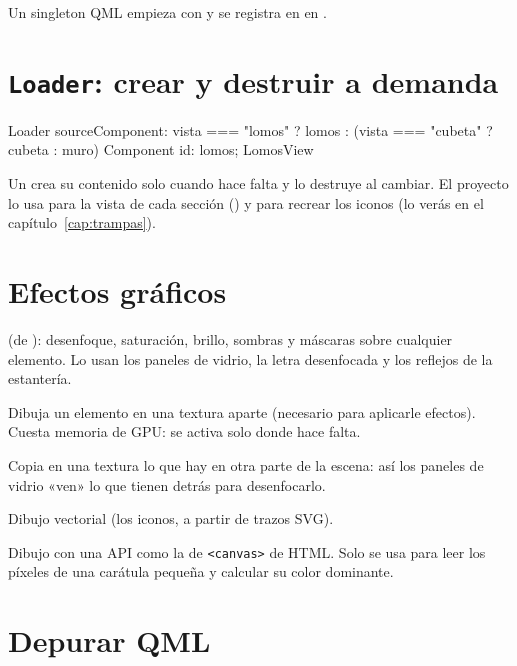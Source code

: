 Un singleton QML empieza con  y se registra en  en
.

\section{\texttt{Loader}: crear y destruir a demanda}

\begin{qml}
Loader {
    sourceComponent: vista === "lomos" ? lomos : (vista === "cubeta" ? cubeta : muro)
}
Component { id: lomos; LomosView { } }
\end{qml}

Un  crea su contenido solo cuando hace falta y lo destruye al cambiar. El
proyecto lo usa para la vista de cada sección () y para recrear
los iconos (lo verás en el capítulo~\ref{cap:trampas}).

\section{Efectos gráficos}

\begin{description}[leftmargin=1.2em]
  \item[\cod{MultiEffect}] (de ): desenfoque, saturación, brillo,
  sombras y máscaras sobre cualquier elemento. Lo usan los paneles de vidrio, la letra
  desenfocada y los reflejos de la estantería.
  \item[\cod{layer.enabled}] Dibuja un elemento en una textura aparte (necesario para
  aplicarle efectos). Cuesta memoria de GPU: se activa solo donde hace falta.
  \item[\cod{ShaderEffectSource}] Copia en una textura lo que hay en otra parte de la escena:
  así los paneles de vidrio «ven» lo que tienen detrás para desenfocarlo.
  \item[\cod{Shape}] Dibujo vectorial (los iconos, a partir de trazos SVG).
  \item[\cod{Canvas}] Dibujo con una API como la de \texttt{<canvas>} de HTML. Solo se usa para
  leer los píxeles de una carátula pequeña y calcular su color dominante.
\end{description}

\section{Depurar QML}

